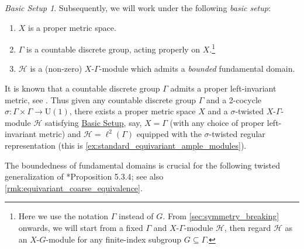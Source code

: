 \documentclass{amsart}
\numberwithin{figure}{section}
\numberwithin{equation}{section}
\numberwithin{table}{section}
\theoremstyle{plain}
\theoremstyle{definition}
\theoremstyle{remark}
\theoremstyle{nonumber}
\newtheorem{basicsetup}{Basic Setup}
\newcommand{\refbasicsetup}{\hyperref[basic_setup]{Basic Setup}}
\begin{document}
\begin{basicsetup}\label{basic_setup}
Subsequently, we will work under the following \emph{basic
setup}:
\begin{enumerate}
\item \( X \) is a proper metric space.
\item \( \Gamma \) is a countable discrete group, 
acting properly on \( X \).\footnote{Here we use the notation $\Gamma$
instead of $G$. From
\cref{sec:symmetry_breaking} onwards, we will start from a fixed
$\Gamma$ and $X$-$\Gamma$-module $\mathcal{H}$, then regard $\mathcal{H}$
as an $X$-$G$-module for any finite-index subgroup $G\subseteq\Gamma$.}
\item $\mathcal{H}$ is a (non-zero) $X$-$\Gamma$-module which admits a 
\emph{bounded} fundamental domain.
\end{enumerate}
\end{basicsetup}



It is known that a countable discrete group $\Gamma$ admits a proper
left-invariant metric, see
\cite{Smith:Asymptotic_dimension_abelian_groups}.  Thus given any
countable discrete group \( \Gamma \) and a 2-cocycle \( \sigma\colon
\Gamma\times \Gamma\to\mathrm{U}(1) \), there  exists a proper
metric space \( X \) and a \( \sigma \)-twisted \( X \)-\( \Gamma
\)-module \( \mathcal{H}\) satisfying \refbasicsetup, say, \( X=\Gamma \)
(with any choice of proper left-invariant metric) and \(
\mathcal{H}=\ell^2(\Gamma) \) equipped with the \( \sigma \)-twisted
regular representation (this is \cref{ex:standard_equivariant_ample_modules}).

The boundedness of fundamental domains is crucial for
the following twisted generalization of
\cite{Willett-Yu:Higher_index_theory}*{Proposition 5.3.4}; see also
\cref{rmk:equivariant_coarse_equivalence}.
\end{document}
